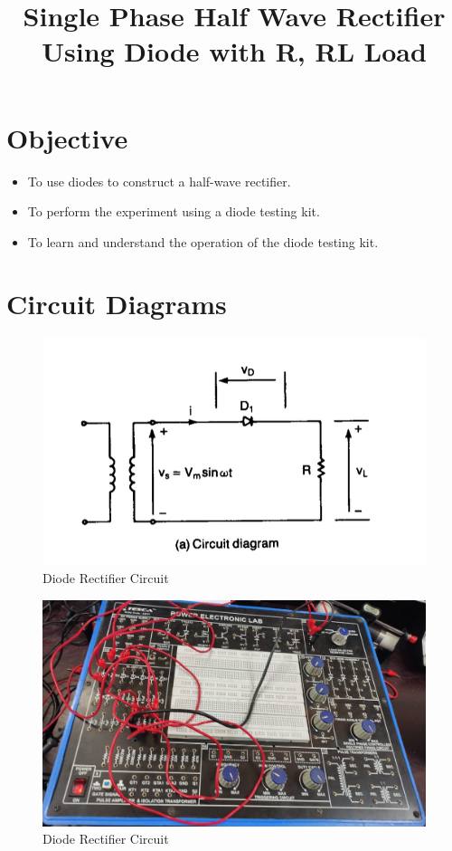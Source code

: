 \documentclass[12pt]{article}
\title{Single Phase Half Wave Rectifier Using Diode with R, RL Load}
\author{}
\date{}
\begin{document}
% 

\pagebreak


\pagebreak
{}
\maketitle

\section*{Objective}
\begin{itemize}
    \item To use diodes to construct a half-wave rectifier.
    \item To perform the experiment using a diode testing kit.
    \item To learn and understand the operation of the diode testing kit.
\end{itemize}

\section*{Circuit Diagrams}
\begin{figure}[H]
    \centering
    \includegraphics[width=.7\textwidth]{half_ckt.png}
    \caption{Diode Rectifier Circuit \cite{rashid2013power}}
    \label{fig:dc_r_load}
\end{figure}

\begin{figure}[H]
    \centering
    \includegraphics[width=.7\textwidth]{half_wave.jpeg}
    \caption{Diode Rectifier Circuit \cite{rashid2013power}}
    \label{fig:dc_oad}
\end{figure}
\end{document}
